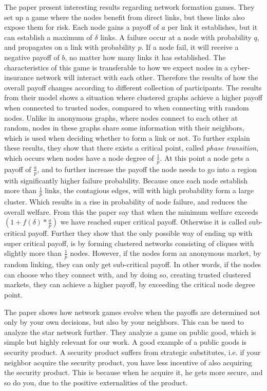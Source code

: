 The paper \cite{contagion} present interesting results regarding network formation games. 
They set up a game where the nodes benefit from direct links, but these links also expose them for risk. 
Each node gains a payoff of $a$ per link it establishes, but it can establish a maximum of $\delta$ links.
A failure occur at a node with probability $q$, and propagates on a link with probability $p$. If a node fail, it will receive a negative payoff of $b$, no matter how many links it has established. The characteristics of this game is transferable to how we expect nodes in a cyber-insurance network will interact with each other. Therefore the results of how the overall payoff changes according to different collection of participants. 
The results from their model shows a situation where clustered graphs achieve a higher payoff when connected to trusted nodes, compared to when connecting with random nodes. Unlike in anonymous graphs, where nodes connect to each other at random, nodes in these graphs share some information with their neighbors, which is used when deciding whether to form a link or not. 
To further explain these results, they show that there exists a critical point, called \textit{phase transition}, which occurs when nodes have a node degree of $\frac{1}{p}$. 
At this point a node gets a payoff of $\frac{a}{p}$, and to further increase the payoff the node needs to go into a region with significantly higher failure probability. 
Because once each node establish more than $\frac{1}{p}$ links, the contagious edges, will with high probability form a large cluster. Which results in a rise in probability of node failure, and reduces the overall welfare.
From this the paper say that when the minimum welfare exceeds 
$(1+f(\delta)*\frac{a}{p})$
we have reached super critical payoff. Otherwise it is called sub-critical payoff. 
Further they show that the only possible way of ending up with super critical payoff, is by forming clustered networks consisting of cliques with slightly more than $\frac{1}{p}$ nodes. 
However, if the nodes form an anonymous market, by random linking, they can only get sub-critical payoff. 
In other words, if the nodes can choose who they connect with, and by doing so, creating trusted clustered markets, they can achieve a higher payoff, by exceeding the critical node degree point. 


The paper \cite{networkgames} shows how network games evolve when the payoffs are determined not only by your own decisions, but also by your neighbors. This can be used to analyze the star network further. They analyze a game on public good, which is simple but highly relevant for our work. A good example of a public goods is security product. A security product suffers from strategic substitutes, i.e. if your neighbor acquire the security product, you have less incentive of also acquiring the security product. This is because when he acquire it, he gets more secure, and so do you, due to the positive externalities of the product.

